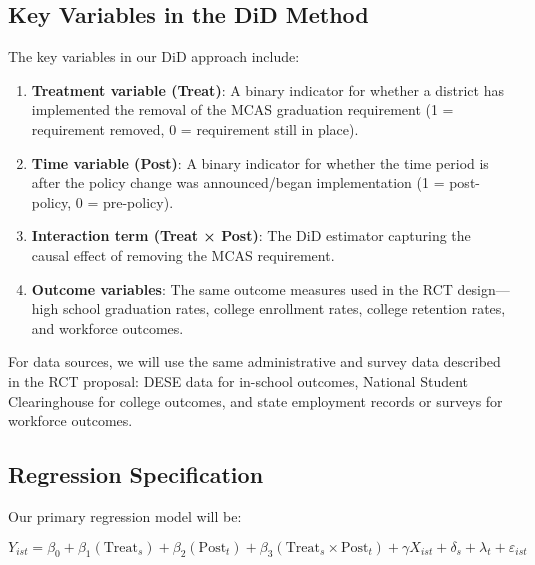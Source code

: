 \documentclass[12pt]{article}
\begin{document}
\subsection{Key Variables in the DiD Method}

The key variables in our DiD approach include:

\begin{enumerate}
    \item \textbf{Treatment variable (Treat)}: A binary indicator for whether a district has implemented the removal of the MCAS graduation requirement (1 = requirement removed, 0 = requirement still in place).

    \item \textbf{Time variable (Post)}: A binary indicator for whether the time period is after the policy change was announced/began implementation (1 = post-policy, 0 = pre-policy).

    \item \textbf{Interaction term (Treat × Post)}: The DiD estimator capturing the causal effect of removing the MCAS requirement.

    \item \textbf{Outcome variables}: The same outcome measures used in the RCT design—high school graduation rates, college enrollment rates, college retention rates, and workforce outcomes.
\end{enumerate}

For data sources, we will use the same administrative and survey data described in the RCT proposal: DESE data for in-school outcomes, National Student Clearinghouse for college outcomes, and state employment records or surveys for workforce outcomes.

\subsection{Regression Specification}

Our primary regression model will be:

\begin{equation}
Y_{ist} = \beta_0 + \beta_1(\text{Treat}_s) + \beta_2(\text{Post}_t) + \beta_3(\text{Treat}_s \times \text{Post}_t) + \gamma X_{ist} + \delta_s + \lambda_t + \varepsilon_{ist}
\end{equation}
\end{document}
